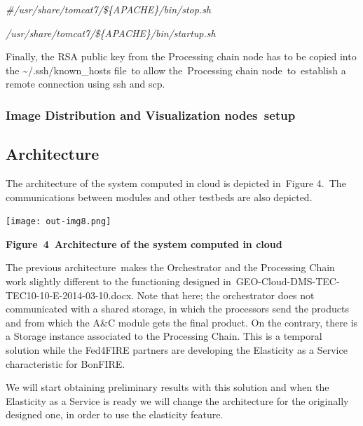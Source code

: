 \documentclass[a4paper]{article}
\begin{document}
\bigskip

{\itshape
\#/usr/share/tomcat7/\$\{APACHE\}/bin/stop.sh}

{\itshape
/usr/share/tomcat7/\$\{APACHE\}/bin/startup.sh}


\bigskip

Finally, the RSA public key from the Processing chain node has to be
copied into the \~{}/.ssh/known\_hosts file\ to allow the\ Processing
chain node\ to\ establish a remote connection using ssh and scp.

\subsubsection[Image Distribution and Visualization nodes\ setup]{Image
Distribution and Visualization nodes\ setup}
\hypertarget{Toc390097028}{}
\bigskip


\bigskip

\subsection[Architecture]{Architecture}
\hypertarget{Toc390097029}{}
\bigskip

The architecture of the system computed in cloud is depicted in\ Figure
4.\ The communications between modules and other testbeds are also
depicted.\ 


\bigskip


\bigskip

{\centering 
\texttt{[image: out-img8.png]} \par}


\bigskip

{\centering\bfseries
\label{bkm:Ref390088635}Figure\ 4\ Architecture of the system computed
in cloud
\par}


\bigskip

The previous architecture\ makes the Orchestrator and the Processing
Chain work slightly different to the functioning designed
in\ GEO-Cloud-DMS-TEC-TEC10-10-E-2014-03-10.docx. Note that here; the
orchestrator does not communicated with a shared storage, in which the
processors send the products and from which the A\&C module gets the
final product. On the contrary, there is a Storage instance associated
to the Processing Chain. This is a temporal solution while the Fed4FIRE
partners are developing the Elasticity as a Service characteristic for
BonFIRE.\ 


\bigskip

We will start obtaining preliminary results with this solution and when
the Elasticity as a Service is ready we will change the architecture
for the originally designed one, in order to use the elasticity
feature.
\end{document}
